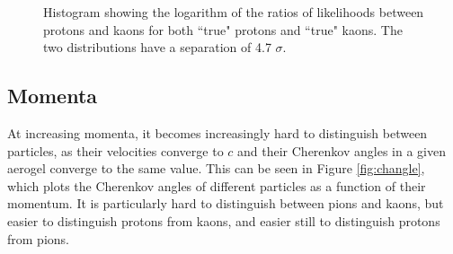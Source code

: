 \begin{figure}[]
\centering
{}
\caption[Particle identification separation for 7 GeV kaons and protons]{Histogram showing the logarithm of the ratios of likelihoods between protons and kaons for both ``true" protons and ``true" kaons. The two distributions have a separation of  4.7 $\sigma$.}
\label{fig:kaonprotonsep} 
\end{figure}

\subsection{Momenta}

At increasing momenta, it becomes increasingly hard to distinguish between particles, as their velocities converge to $c$ and their Cherenkov angles in a given aerogel converge to the same value. 
This can be seen in Figure \ref{fig:changle}, which plots the Cherenkov angles of different particles as a function of their momentum.
It is particularly hard to distinguish between pions and kaons, but easier to distinguish protons from kaons, and easier still to distinguish protons from pions.

